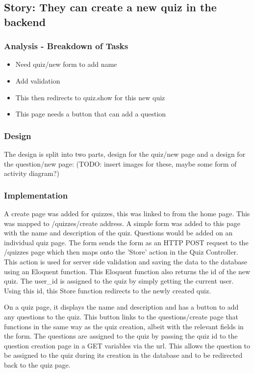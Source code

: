 \subsection{Story: They can create a new quiz in the backend}
\subsubsection{Analysis - Breakdown of Tasks}
\begin{itemize}
	\item Need quiz/new form to add name
	\item Add validation
	\item This then redirects to quiz.show for this new quiz
	\item This page needs a button that can add a question
\end{itemize}
\subsubsection{Design}
The design is split into two parts, design for the quiz/new page and a design for the question/new page:
(TODO: insert images for these, maybe some form of activity diagram?)
\subsubsection{Implementation}
A create page was added for quizzes, this was linked to from the home page. This was mapped to /quizzes/create address. A simple form was added to this page with the name and description of the quiz. Questions would be added on an individual quiz page. The form sends the form as an HTTP POST request to the /quizzes page which then maps onto the 'Store' action in the Quiz Controller. This action is used for server side validation and saving the data to the database using an Eloquent function. This Eloquent function also returns the id of the new quiz. The user\_id is assigned to the quiz by simply getting the current user. Using this id, this Store function redirects to the newly created quiz.

On a quiz page, it displays the name and description and has a button to add any questions to the quiz. This button links to the questions/create page that functions in the same way as the quiz creation, albeit with the relevant fields in the form. The questions are assigned to the quiz by passing the quiz id to the question creation page in a GET variables via the url. This allows the question to be assigned to the quiz during its creation in the database and to be redirected back to the quiz page.

